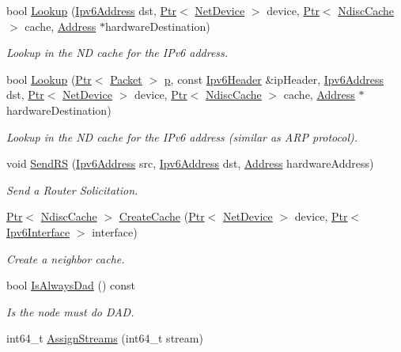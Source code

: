 \begin{DoxyCompactItemize}
bool \hyperlink{classns3_1_1Icmpv6L4Protocol_abfb3e1df3fc0d57d3076aa00edba62cd}{Lookup} (\hyperlink{classns3_1_1Ipv6Address}{Ipv6\+Address} dst, \hyperlink{classns3_1_1Ptr}{Ptr}$<$ \hyperlink{classns3_1_1NetDevice}{Net\+Device} $>$ device, \hyperlink{classns3_1_1Ptr}{Ptr}$<$ \hyperlink{classns3_1_1NdiscCache}{Ndisc\+Cache} $>$ cache, \hyperlink{classns3_1_1Address}{Address} $\ast$hardware\+Destination)
\begin{DoxyCompactList}\small\item\em Lookup in the ND cache for the I\+Pv6 address. \end{DoxyCompactList}\item 
bool \hyperlink{classns3_1_1Icmpv6L4Protocol_aa4d97bb59a89c2d5b41c76ebe9a54f14}{Lookup} (\hyperlink{classns3_1_1Ptr}{Ptr}$<$ \hyperlink{classns3_1_1Packet}{Packet} $>$ \hyperlink{lte__link__budget__x2__handover__measures_8m_ac9de518908a968428863f829398a4e62}{p}, const \hyperlink{classns3_1_1Ipv6Header}{Ipv6\+Header} \&ip\+Header, \hyperlink{classns3_1_1Ipv6Address}{Ipv6\+Address} dst, \hyperlink{classns3_1_1Ptr}{Ptr}$<$ \hyperlink{classns3_1_1NetDevice}{Net\+Device} $>$ device, \hyperlink{classns3_1_1Ptr}{Ptr}$<$ \hyperlink{classns3_1_1NdiscCache}{Ndisc\+Cache} $>$ cache, \hyperlink{classns3_1_1Address}{Address} $\ast$hardware\+Destination)
\begin{DoxyCompactList}\small\item\em Lookup in the ND cache for the I\+Pv6 address (similar as A\+RP protocol). \end{DoxyCompactList}\item 
void \hyperlink{classns3_1_1Icmpv6L4Protocol_aaf09883d79f1a055df31d23089a0ea3b}{Send\+RS} (\hyperlink{classns3_1_1Ipv6Address}{Ipv6\+Address} src, \hyperlink{classns3_1_1Ipv6Address}{Ipv6\+Address} dst, \hyperlink{classns3_1_1Address}{Address} hardware\+Address)
\begin{DoxyCompactList}\small\item\em Send a Router Solicitation. \end{DoxyCompactList}\item 
\hyperlink{classns3_1_1Ptr}{Ptr}$<$ \hyperlink{classns3_1_1NdiscCache}{Ndisc\+Cache} $>$ \hyperlink{classns3_1_1Icmpv6L4Protocol_a2ef0a9fca4f92a30636372bd6f524847}{Create\+Cache} (\hyperlink{classns3_1_1Ptr}{Ptr}$<$ \hyperlink{classns3_1_1NetDevice}{Net\+Device} $>$ device, \hyperlink{classns3_1_1Ptr}{Ptr}$<$ \hyperlink{classns3_1_1Ipv6Interface}{Ipv6\+Interface} $>$ interface)
\begin{DoxyCompactList}\small\item\em Create a neighbor cache. \end{DoxyCompactList}\item 
bool \hyperlink{classns3_1_1Icmpv6L4Protocol_a4accbc330d1a40eca87f03a519d4b1e2}{Is\+Always\+Dad} () const 
\begin{DoxyCompactList}\small\item\em Is the node must do D\+AD. \end{DoxyCompactList}\item 
int64\+\_\+t \hyperlink{classns3_1_1Icmpv6L4Protocol_a04e895ff9568d57d5d97de08577f08b9}{Assign\+Streams} (int64\+\_\+t stream)
\end{DoxyCompactItemize}

